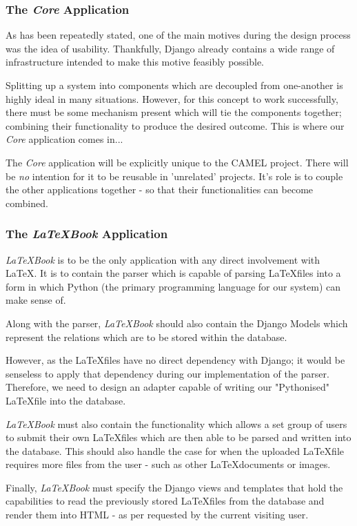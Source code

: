 	\subsubsection*{The \textit{Core} Application}
		As has been repeatedly stated, one of the main motives during the design process was the idea of usability. Thankfully, Django already contains a wide range of infrastructure intended to make this motive feasibly possible.
		
		Splitting up a system into components which are decoupled from one-another is highly ideal in many situations. However, for this concept to work successfully, there must be some mechanism present which will tie the components together; combining their functionality to produce the desired outcome. This is where our \textit{Core} application comes in...
		
		The \textit{Core} application will be explicitly unique to the CAMEL project. There will be \emph{no} intention for it to be reusable in 'unrelated' projects. It's role is to couple the other applications together - so that their functionalities can become combined.
	
	\subsubsection*{The \textit{\LaTeX Book} Application}
		\textit{\LaTeX Book} is to be the only application with any direct involvement with \LaTeX. It is to contain the parser which is capable of parsing \LaTeX files into a form in which Python (the primary programming language for our system) can make sense of.
		
		Along with the parser, \textit{\LaTeX Book} should also contain the Django Models which represent the relations which are to be stored within the database.
		
		However, as the \LaTeX files have no direct dependency with Django; it would be senseless to apply that dependency during our implementation of the parser. Therefore, we need to design an adapter capable of writing our "Pythonised" \LaTeX file into the database.
		
		\textit{\LaTeX Book} must also contain the functionality which allows a set group of users to submit their own \LaTeX files which are then able to be parsed and written into the database. This should also handle the case for when the uploaded \LaTeX file requires more files from the user - such as other \LaTeX documents or images.
		
		Finally, \textit{\LaTeX Book} must specify the Django views and templates that hold the capabilities to read the previously stored \LaTeX files from the database and render them into HTML - as per requested by the current visiting user.
	
